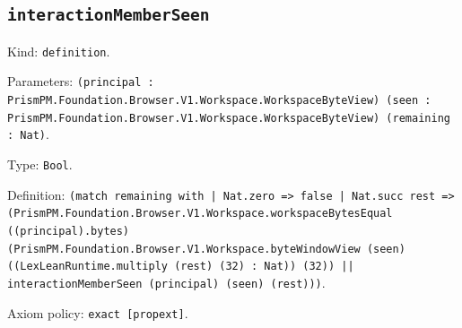 \documentclass[11pt]{article}
\begin{document}
\subsection*{\texttt{interactionMemberSeen}}
\noindent Kind: \texttt{definition}.\par
\noindent Parameters: \texttt{(principal : PrismPM.Foundation.Browser.V1.Workspace.WorkspaceByteView) (seen : PrismPM.Foundation.Browser.V1.Workspace.WorkspaceByteView) (remaining : Nat)}.\par
\noindent Type: \texttt{Bool}.\par
\noindent Definition: \texttt{(match remaining with | Nat.zero => false | Nat.succ rest => (PrismPM.Foundation.Browser.V1.Workspace.workspaceBytesEqual ((principal).bytes) (PrismPM.Foundation.Browser.V1.Workspace.byteWindowView (seen) ((LexLeanRuntime.multiply (rest) (32) : Nat)) (32)) || interactionMemberSeen (principal) (seen) (rest)))}.\par
\noindent Axiom policy: \texttt{exact [propext]}.\par
\end{document}
